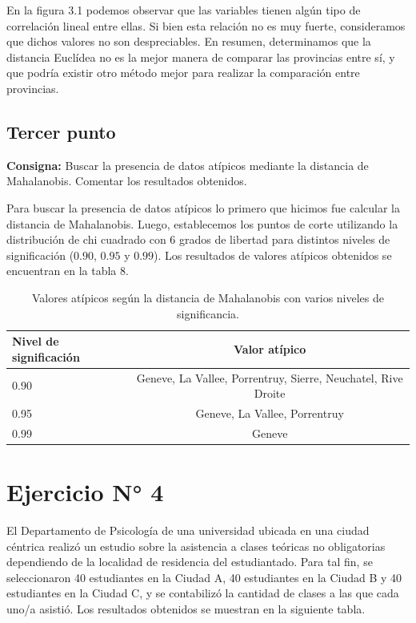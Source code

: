 \documentclass{article} %
\begin{document}
En la figura 3.1 podemos observar que las variables tienen algún tipo de correlación lineal entre ellas. Si bien esta relación no es muy fuerte, consideramos que dichos valores no son despreciables. En resumen, determinamos que la distancia Euclídea no es la mejor manera de comparar las provincias entre sí, y que podría existir otro método mejor para realizar la comparación entre provincias.

\subsection{Tercer punto}

\textbf{Consigna:} Buscar la presencia de datos atípicos mediante la distancia de Mahalanobis. Comentar los resultados obtenidos.

Para buscar la presencia de datos atípicos lo primero que hicimos fue calcular la distancia de Mahalanobis. Luego, establecemos los puntos de corte utilizando la distribución de chi cuadrado con 6 grados de libertad para distintos niveles de significación ($0.90$, $0.95$ y $0.99$).  Los resultados de valores atípicos obtenidos se encuentran en la tabla 8.

\begin{table}[H]
	\centering
		\begin{tabular}{||l | c ||}
			\hline
			\hline
			Nivel de significación & Valor atípico\\
			\hline			
			\hline
			0.90 & Geneve, La Vallee, Porrentruy, Sierre, Neuchatel, Rive Droite\\
			\hline
			0.95 & Geneve, La Vallee, Porrentruy\\
			\hline
			0.99 & Geneve\\
			\hline
			\hline
		\end{tabular}
		\caption{Valores atípicos según la distancia de Mahalanobis con varios niveles de significancia.}
	\label{tab:table-punto-3-3}
\end{table}

\section{Ejercicio N° 4}
El Departamento de Psicología de una universidad ubicada en una ciudad céntrica realizó un estudio sobre la asistencia a clases teóricas no obligatorias dependiendo de la localidad de residencia del estudiantado. Para tal fin, se seleccionaron 40 estudiantes en la Ciudad A, 40 estudiantes en la Ciudad B y 40 estudiantes en la Ciudad C, y se contabilizó la cantidad de clases a las que cada uno/a asistió. Los resultados obtenidos se muestran en la siguiente tabla.
\end{document}
